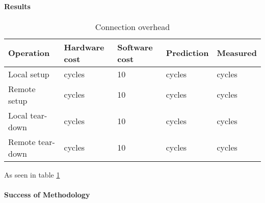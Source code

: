 \paragraph{Results}
\begin{table} [h]
\begin{center}
\begin{tabular}{| l | l | l | l | l |}
\hline
Operation & Hardware cost & Software cost & Prediction & Measured \\ \hline
Local setup 	&  cycles		& 10			&  cycles	&  cycles \\ \hline
Remote setup	&  cycles		& 10			&  cycles	&  cycles \\ \hline
Local tear-down 	&  cycles		& 10			&  cycles	&  cycles \\ \hline
Remote tear-down	&  cycles		& 10			&  cycles	&  cycles \\ \hline



\end{tabular}
\end{center}
\caption{Connection overhead\label{tab:connection-overhead}}
\end{table}

As seen in table \ref{tab:connection-overhead}

\paragraph{Success of Methodology}
